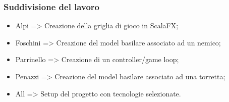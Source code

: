 \subsubsection*{Suddivisione del lavoro}
\begin{itemize}
  \item Alpi => Creazione della griglia di gioco in ScalaFX;
  \item Foschini => Creazione del model basilare associato ad un nemico;
  \item Parrinello => Creazione di un controller/game loop;
  \item Penazzi => Creazione del model basilare associato ad una torretta;
  \item All => Setup del progetto con tecnologie selezionate.
\end{itemize}

\newpage

